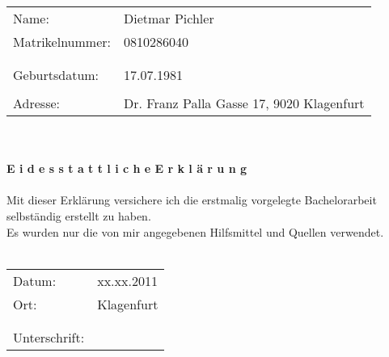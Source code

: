 \begin{titlepage}
\hspace{-1cm}\begin{tabular}{p{5cm} l}
Name: & Dietmar Pichler\\
Matrikelnummer: & 0810286040\\
& \\
& \\
Geburtsdatum: & 17.07.1981\\
& \\
Adresse: & Dr. Franz Palla Gasse 17, 9020 Klagenfurt\\
%
\end{tabular}\\
\vspace{3.5cm}\\
\Large{\textbf{E i d e s s t a t t l i c h e \hspace{0.3cm} E r k l ä r u n g}}\\
\vspace{5cm}\\ \normalsize
Mit dieser Erklärung versichere ich die erstmalig vorgelegte Bachelorarbeit selbständig erstellt zu haben.\\
Es wurden nur die von mir angegebenen Hilfsmittel und Quellen verwendet.\\
\vspace{3cm}\\
\begin{tabular}{p{5cm} l}
Datum: & xx.xx.2011\\
Ort: & Klagenfurt\\
& \\
& \\
Unterschrift: & \\
%
\end{tabular}
\end{titlepage} 